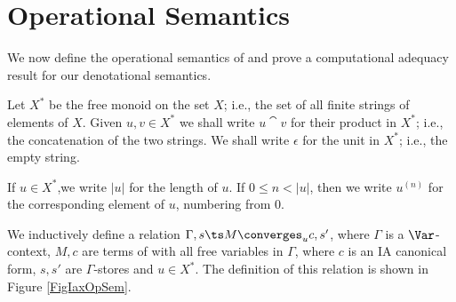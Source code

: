 \section{Operational Semantics}

We now define the operational semantics of \IAX and prove a computational adequacy result for our denotational semantics.

\begin{definition}
  Let $X^*$ be the free monoid on the set $X$; i.e., the set of all finite strings of elements of $X$.
  Given $u,v\in X^*$ we shall write $u\cat v$ for their product in $X^*$; i.e., the concatenation of the two strings.
  We shall write $\epsilon$ for the unit in $X^*$; i.e., the empty string.

  If $u\in X^*$,we write $|u|$ for the length of $u$.
  If $0\le n < |u|$, then we write $u^{(n)}$ for the corresponding element of $u$, numbering from $0$.

  We inductively define a relation $\Gamma,s\ts M\converges_u c,s'$, where $\Gamma$ is a $\Var$-context, $M,c$ are terms of \IAX with all free variables in $\Gamma$, where $c$ is an IA canonical form, $s,s'$ are $\Gamma$-stores and $u\in X^*$.
  The definition of this relation is shown in Figure \ref{FigIaxOpSem}.


\end{definition}
